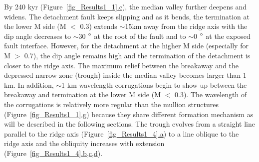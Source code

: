 
By 240 kyr (Figure~\hyperref[fig_Results1_1]{\ref{fig_Results1_1}.c}), the median valley further deepens and widens. The detachment fault keeps slipping and as it bends, the termination at the lower M side (M $<$ 0.3) extends $\sim$15km away from the ridge axis with the dip angle decreases to $\sim$30 $\degree$ at the root of the fault and to $\sim$0 $\degree$ at the exposed fault interface. However, for the detachment at the higher M side (especially for M $>$ 0.7), the dip angle remains high and the termination of the detachment is closer to the ridge axis. The maximum relief between the breakaway and the depressed narrow zone (trough) inside the median valley becomes larger than 1 km. In addition, $\sim$1 km wavelength corrugations begin to show up between the breakaway and termination at the lower M side (M $<$ 0.3). The wavelength of the corrugations is relatively more regular than the mullion structures (Figure~\hyperref[fig_Results1_1]{\ref{fig_Results1_1}.g}) because they share different formation mechanism as will be described in the following sections. The trough evolves from a straight line parallel to the ridge axis (Figure~\hyperref[fig_Results1_4]{\ref{fig_Results1_4}.a}) to a line oblique to the ridge axis and the obliquity increases with extension (Figure~\hyperref[fig_Results1_4]{\ref{fig_Results1_4}.b,c,d}). 

